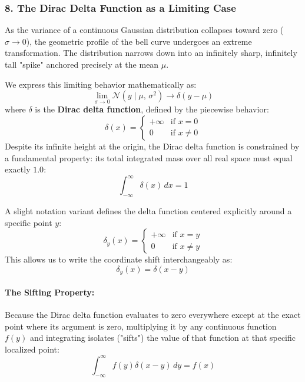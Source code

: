 \documentclass{article}
\begin{document}
\subsubsection*{8. The Dirac Delta Function as a Limiting Case}
As the variance of a continuous Gaussian distribution collapses toward zero ($\sigma \to 0$), the geometric profile of the bell curve undergoes an extreme transformation. The distribution narrows down into an infinitely sharp, infinitely tall "spike" anchored precisely at the mean $\mu$. 

We express this limiting behavior mathematically as:
\begin{equation}
    \lim_{\sigma \to 0} \mathcal{N}(y \mid \mu, \, \sigma^2) \longrightarrow \delta(y - \mu) \tag{2.124}
\end{equation}
where $\delta$ is the \textbf{Dirac delta function}, defined by the piecewise behavior:
\begin{equation}
    \delta(x) = \begin{cases} 
        +\infty & \text{if } x = 0 \\ 
        0 & \text{if } x \neq 0 
    \end{cases} \tag{2.125}
\end{equation}
Despite its infinite height at the origin, the Dirac delta function is constrained by a fundamental property: its total integrated mass over all real space must equal exactly $1.0$:
\begin{equation}
    \int_{-\infty}^{\infty} \delta(x) \, dx = 1 \tag{2.126}
\end{equation}

A slight notation variant defines the delta function centered explicitly around a specific point $y$:
\begin{equation}
    \delta_y(x) = \begin{cases} 
        +\infty & \text{if } x = y \\ 
        0 & \text{if } x \neq y 
    \end{cases} \tag{2.127}
\end{equation}
This allows us to write the coordinate shift interchangeably as:
\begin{equation}
    \delta_y(x) = \delta(x - y) \tag{2.128}
\end{equation}

\paragraph{The Sifting Property:}
Because the Dirac delta function evaluates to zero everywhere except at the exact point where its argument is zero, multiplying it by any continuous function $f(y)$ and integrating isolates ("sifts") the value of that function at that specific localized point:
\begin{equation}
    \int_{-\infty}^{\infty} f(y) \delta(x - y) \, dy = f(x) \tag{2.129}
\end{equation}
\end{document}
